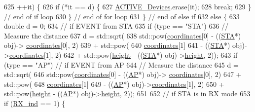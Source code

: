 \begin{DoxyCode}
{{{625                 ++it) \{
626             \textcolor{keywordflow}{if} (*it == d) \{
627                 \hyperlink{classSTA_a536179d10f961ae6f7330b980a13668e}{ACTIVE\_Devices}.erase(it);
628                 \textcolor{keywordflow}{break};
629             \} \textcolor{comment}{// end of if loop}
630         \} \textcolor{comment}{// end of for loop}
631     \} \textcolor{comment}{// end of else if}
632     \textcolor{keywordflow}{else} \{
633         \textcolor{keywordtype}{double} d = 0;
634         \textcolor{comment}{// if EVENT from STA}
635         \textcolor{keywordflow}{if} (type == \textcolor{stringliteral}{"STA"})
636             \textcolor{comment}{// Measure the distance }
637             d = std::sqrt(
638                     std::pow(\hyperlink{classSTA_aba57e1e65b70a3b6f556495e47f6838a}{coordinates}[0] - ((\hyperlink{classSTA}{STA}*) obj)->
      \hyperlink{classSTA_aba57e1e65b70a3b6f556495e47f6838a}{coordinates}[0], 2)
639                             + std::pow(
640                                     \hyperlink{classSTA_aba57e1e65b70a3b6f556495e47f6838a}{coordinates}[1]
641                                             - ((\hyperlink{classSTA}{STA}*) obj)->\hyperlink{classSTA_aba57e1e65b70a3b6f556495e47f6838a}{coordinates}[1], 2)
642                             + std::pow(\hyperlink{classSTA_a85ba9b72f68ceeef8c89f02806c71890}{height} - ((\hyperlink{classSTA}{STA}*) obj)->\hyperlink{classSTA_a85ba9b72f68ceeef8c89f02806c71890}{height}, 2));
643         \textcolor{keywordflow}{if} (type == \textcolor{stringliteral}{"AP"}) \textcolor{comment}{// if EVENT from AP}
644             \textcolor{comment}{// Measure the distance }
645             d = std::sqrt(
646                     std::pow(\hyperlink{classSTA_aba57e1e65b70a3b6f556495e47f6838a}{coordinates}[0] - ((\hyperlink{classAP}{AP}*) obj)->
      \hyperlink{classSTA_aba57e1e65b70a3b6f556495e47f6838a}{coordinates}[0], 2)
647                             + std::pow(
648                                     \hyperlink{classSTA_aba57e1e65b70a3b6f556495e47f6838a}{coordinates}[1]
649                                             - ((\hyperlink{classAP}{AP}*) obj)->\hyperlink{classSTA_aba57e1e65b70a3b6f556495e47f6838a}{coordinates}[1], 2)
650                             + std::pow(\hyperlink{classSTA_a85ba9b72f68ceeef8c89f02806c71890}{height} - ((\hyperlink{classAP}{AP}*) obj)->\hyperlink{classSTA_a85ba9b72f68ceeef8c89f02806c71890}{height}, 2));
651 
652         \textcolor{comment}{// if STA is in RX mode}
653         \textcolor{keywordflow}{if} (\hyperlink{classSTA_aace6d664e5ecf495177277ef030141c6}{RX\_ind} == 1) \{
}}}
\end{DoxyCode}
